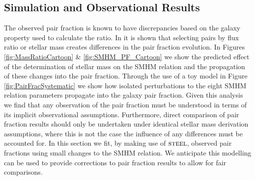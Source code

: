 \subsection{Simulation and Observational Results}
\label{subsec:SimObsRes}
The observed pair fraction is known to have discrepancies based on the galaxy property used to calculate the ratio. In \citet{Man2016RESOLVING03} it is shown that selecting pairs by flux ratio or stellar mass creates differences in the pair fraction evolution. 
In Figures \ref{fig:MassRatioCartoon} \& \ref{fig:SMHM_PF_Cartoon} we show the predicted effect of the determination of stellar mass on the SMHM relation and the propagation of these changes into the pair fraction. 
Through the use of a toy model in Figure \ref{fig:PairFracSystematic} we show how isolated perturbations to the eight SMHM relation parameters propagate into the galaxy pair fraction.
Given this analysis we find that any observation of the pair fraction must be understood in terms of its implicit observational assumptions. 
Furthermore, direct comparison of pair fraction results should only be undertaken under identical stellar mass derivation assumptions, where this is not the case the influence of any differences must be accounted for.
In this section we fit, by making use of $\textsc{steel}$, observed pair fractions using small changes to the SMHM relation.
We anticipate this modelling can be used to provide corrections to pair fraction results to allow for fair comparisons.

